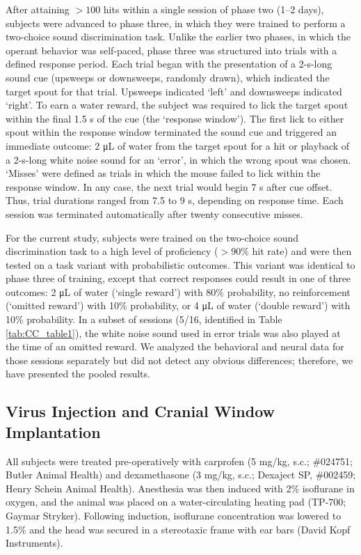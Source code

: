 After attaining $>100$ hits within a single session of phase two (1–2 days), subjects were advanced to phase three, in which they were trained to perform a two-choice sound discrimination task. Unlike the earlier two phases, in which the operant behavior was self-paced, phase three was structured into trials with a defined response period. Each trial began with the presentation of a 2-s-long sound cue (upsweeps or downsweeps, randomly drawn), which indicated the target spout for that trial. Upsweeps indicated ‘left’ and downsweeps indicated ‘right’. To earn a water reward, the subject was required to lick the target spout within the final 1.5 s of the cue (the ‘response window’). The first lick to either spout within the response window terminated the sound cue and triggered an immediate outcome: 2 \unit{\micro\liter} of water from the target spout for a hit or playback of a 2-s-long white noise sound for an ‘error’, in which the wrong spout was chosen. ‘Misses’ were defined as trials in which the mouse failed to lick within the response window. In any case, the next trial would begin 7 s after cue offset. Thus, trial durations ranged from 7.5 to 9 s, depending on response time. Each session was terminated automatically after twenty consecutive misses. 

For the current study, subjects were trained on the two-choice sound discrimination task to a high level of proficiency ($>90\%$ hit rate) and were then tested on a task variant with probabilistic outcomes. This variant was identical to phase three of training, except that correct responses could result in one of three outcomes: 2 \unit{\micro\liter} of water (‘single reward’) with 80\% probability, no reinforcement (‘omitted reward’) with 10\% probability, or 4 \unit{\micro\liter} of water (‘double reward’) with 10\% probability. In a subset of sessions (5/16, identified in Table \ref{tab:CC_table1}), the white noise sound used in error trials was also played at the time of an omitted reward. We analyzed the behavioral and neural data for those sessions separately but did not detect any obvious differences; therefore, we have presented the pooled results.



\subsection*{Virus Injection and Cranial Window Implantation}
All subjects were treated pre-operatively with carprofen (5 mg/kg, s.c.; \#024751; Butler Animal Health) and dexamethasone (3 mg/kg, s.c.; Dexaject SP, \#002459; Henry Schein Animal Health). Anesthesia was then induced with 2\% isoflurane in oxygen, and the animal was placed on a water-circulating heating pad (TP-700; Gaymar Stryker). Following induction, isoflurane concentration was lowered to 1.5\% and the head was secured in a stereotaxic frame with ear bars (David Kopf Instruments).

